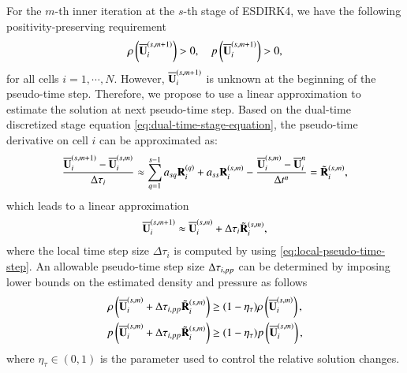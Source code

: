 For the $m$-th inner iteration at the $s$-th stage of ESDIRK4, we have the following positivity-preserving requirement
\begin{equation}
    \label{eq:ppLimit-Tau}
    \rho\left(\overline{\mathbf{U}}_i^{\left(s,m+1\right)} \right)>0, \quad
    p\left(\overline{\mathbf{U}}_i^{\left(s,m+1\right)}\right)>0,
\end{equation}
for all cells $i=1,\cdots,N$. However, $\overline{\mathbf{U}}^{\left(s,m+1\right)}_i$ is unknown at the beginning of the pseudo-time step. Therefore, we propose to use a linear approximation to estimate the solution at next pseudo-time step. Based on the dual-time discretized stage equation \eqref{eq:dual-time-stage-equation}, the pseudo-time derivative on cell $i$ can be approximated as:
\begin{equation}
    \dfrac{\overline{\mathbf{U}}^{\left(s,m+1\right)}_i-\overline{\mathbf{U}}^{\left(s,m\right)}_i}{\mathrm\Delta \tau_i} \approx \sum_{q=1}^{s-1} a_{sq} \mathbf{R}^{\left(q\right)}_i + a_{ss} \mathbf{R}_i^{\left(s,m\right)} - \dfrac{\overline{\mathbf{U}}^{\left(s,m\right)}_i - \overline{\mathbf{U}}^{n}_i}{\mathrm\Delta t^n}= \tilde{\mathbf{R}}^{\left(s,m\right)}_i ,
\end{equation}
which leads to a linear approximation
\begin{equation}
    \label{eq:estimation-dtau}
    \overline{\mathbf{U}}_i^{\left(s,m+1\right)} \approx  \overline{\mathbf{U}}_i^{\left(s,m\right)} + \mathrm\Delta \tau_i  \tilde{\mathbf{R}}^{\left(s,m\right)}_i,
\end{equation}
where the local time step size $\Delta \tau_i$ is computed by using \eqref{eq:local-pseudo-time-step}.
An allowable pseudo-time step size $ \mathrm\Delta \tau_{i,pp}$ can be determined by imposing lower bounds on the estimated density and pressure as follows
\begin{equation}
    \label{eq:ppLimitDtau}
    \begin{aligned}
        \rho\left(\overline{\mathbf{U}}_i^{\left(s,m\right)} +  \mathrm\Delta \tau_{i,pp} \tilde{\mathbf{R}}_i^{\left(s,m\right)}\right)
         & \geq
        (1- \eta_\tau)
        \rho\left(\overline{\mathbf{U}}_i^{\left(s,m\right)}\right)
        , \\
        p\left(\overline{\mathbf{U}}_i^{\left(s,m\right)} + \mathrm\Delta  \tau_{i,pp} \tilde{\mathbf{R}}_i^{\left(s,m\right)}\right)
         & \geq
        (1- \eta_\tau)
        p\left(\overline{\mathbf{U}}_i^{\left(s,m\right)}\right)
        ,
    \end{aligned}
\end{equation}
where $\eta_\tau \in (0,1)$ is the parameter used to control the relative solution changes.

